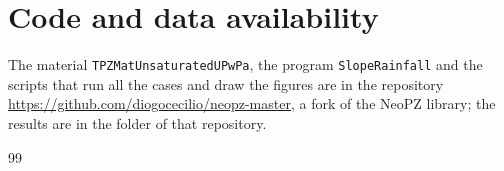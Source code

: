 \documentclass[preprint,12pt,authoryear]{elsarticle}
\begin{document}
\section*{Code and data availability}
The material \texttt{TPZMatUnsaturatedUPwPa}, the program \texttt{SlopeRainfall} and the scripts that run all the
cases and draw the figures are in the repository \url{https://github.com/diogocecilio/neopz-master}, a fork of the
NeoPZ library; the results are in the folder  of that repository.


\begin{thebibliography}{99}

\end{thebibliography}
\end{document}
